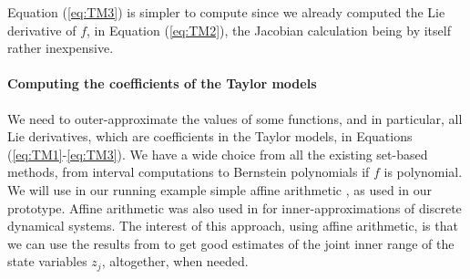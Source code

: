 \documentclass{sig-alternate-05-2015}
\newtheorem{remark}{Remark}
\begin{document}
Equation (\ref{eq:TM3}) 
is simpler to compute since we already computed
the Lie derivative of $f$, in Equation (\ref{eq:TM2}), the Jacobian calculation being by
itself rather 
inexpensive. 

\paragraph{Computing the coefficients of the Taylor models}

We need to outer-approximate the values of some functions, and in particular, all Lie
derivatives, which are coefficients in the Taylor models, in Equations 
(\ref{eq:TM1}-\ref{eq:TM3}). We have a wide choice from all the existing set-based
methods, from interval computations to Bernstein polynomials if $f$
is polynomial. We will use in our running example simple affine arithmetic
\cite{com-sto-93-aa}, as used in our prototype. %
Affine arithmetic was also used in \cite{hscc14} for inner-approximations of
discrete dynamical systems. The interest of this approach, using affine arithmetic,
is that we can use the results from \cite{rc13} to get good estimates of the
joint inner range of the state variables $z_j$, altogether, when needed. 
\end{document}
